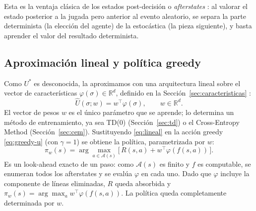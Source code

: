 Esta es la ventaja clásica de los estados post-decisión o \emph{afterstates}
\citep{sutton2018, bertsekas1996}: al valorar el estado posterior a la jugada pero
anterior al evento aleatorio, se separa la parte determinista (la elección del
agente) de la estocástica (la pieza siguiente), y basta aprender el valor del
resultado determinista.

\subsection{Aproximación lineal y política greedy}
Como $U^{*}$ es desconocida, la aproximamos con una arquitectura lineal sobre el
vector de características $\varphi(\sigma) \in \mathbb{R}^{d}$, definido en la
Sección~\ref{sec:caracteristicas} \citep{bertsekas1996}:
\begin{equation}
    \hat{U}(\sigma; w) = w^{\top} \varphi(\sigma), \qquad w \in \mathbb{R}^{d}.
    \label{eq:lineal}
\end{equation}
El vector de pesos $w$ es el único parámetro que se aprende; lo determina un
método de entrenamiento, ya sea TD(0) (Sección~\ref{sec:td}) o el Cross-Entropy
Method (Sección~\ref{sec:cem}). Sustituyendo \eqref{eq:lineal} en la
acción greedy \eqref{eq:greedy-u} (con $\gamma = 1$) se obtiene la política,
parametrizada por $w$:
\begin{equation}
    \pi_{w}(s) = \arg\max_{a \in \mathcal{A}(s)}
    \big[\, R(s,a) + w^{\top} \varphi(f(s,a)) \,\big].
    \label{eq:politica}
\end{equation}
Es un look-ahead exacto de un paso: como $\mathcal{A}(s)$ es finito y $f$ es
computable, se enumeran todos los afterstates y se evalúa $\varphi$ en cada uno.
Dado que $\varphi$ incluye la componente de líneas eliminadas, $R$ queda absorbida y
$\pi_{w}(s) = \arg\max_{a} w^{\top} \varphi(f(s,a))$. La política queda
completamente determinada por $w$.

